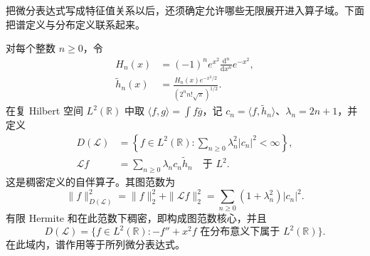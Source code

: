 把微分表达式写成特征值关系以后，还须确定允许哪些无限展开进入算子域。下面把谱定义与分布定义联系起来。
\begin{proposition}[谐振子的自伴定义域]\label{b2:prop:B2-oscillator-domain}
对每个整数 \(n\geq0\)，令
\[
 \begin{aligned}
 H_n(x)&=(-1)^ne^{x^2}\frac{\mathrm d^n}{\mathrm dx^n}e^{-x^2},\\
 \widetilde h_n(x)&=\frac{H_n(x)e^{-x^2/2}}{(2^nn!\sqrt\pi)^{1/2}}.
 \end{aligned}
\]
在复 Hilbert 空间 \(L^2(\mathbb R)\) 中取
\(\langle f,g\rangle=\int f\overline g\)，记
\(c_n=\langle f,\widetilde h_n\rangle\)、\(\lambda_n=2n+1\)，并定义
\[
 \begin{aligned}
 D(\mathcal L)
 &=\left\{f\in L^2(\mathbb R):
 \sum_{n\geq0}\lambda_n^2|c_n|^2<\infty\right\},\\
 \mathcal Lf&=\sum_{n\geq0}\lambda_nc_n\widetilde h_n
 \quad\text{于 }L^2.
 \end{aligned}
\]
这是稠密定义的自伴算子。其图范数为
\begin{equation}\label{b2:eq:B2-oscillator-graph-norm}
 \|f\|_{D(\mathcal L)}^2
 =\|f\|_2^2+\|\mathcal Lf\|_2^2
 =\sum_{n\geq0}(1+\lambda_n^2)|c_n|^2.
\end{equation}
有限 Hermite 和在此范数下稠密，即构成图范数核心，并且
\[
 D(\mathcal L)=
 \{f\in L^2(\mathbb R):
 -f''+x^2f\text{ 在分布意义下属于 }L^2(\mathbb R)\}.
\]
在此域内，谱作用等于所列微分表达式。
\end{proposition}
